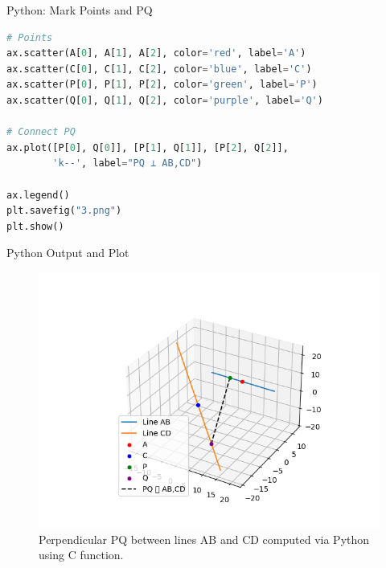\documentclass{beamer}
\begin{document}
\begin{frame}[fragile]{Python: Mark Points and PQ}
\begin{lstlisting}[language=Python]
# Points
ax.scatter(A[0], A[1], A[2], color='red', label='A')
ax.scatter(C[0], C[1], C[2], color='blue', label='C')
ax.scatter(P[0], P[1], P[2], color='green', label='P')
ax.scatter(Q[0], Q[1], Q[2], color='purple', label='Q')

# Connect PQ
ax.plot([P[0], Q[0]], [P[1], Q[1]], [P[2], Q[2]],
        'k--', label="PQ ⟂ AB,CD")

ax.legend()
plt.savefig("3.png")
plt.show()
\end{lstlisting}
\end{frame}


\begin{frame}{Python Output and Plot}
\begin{figure}[h!]
\centering
\includegraphics[width=0.75\columnwidth]{figs/3.png}
\caption{Perpendicular PQ between lines AB and CD computed via Python using C function.}
\end{figure}
\end{frame}
\end{document}
